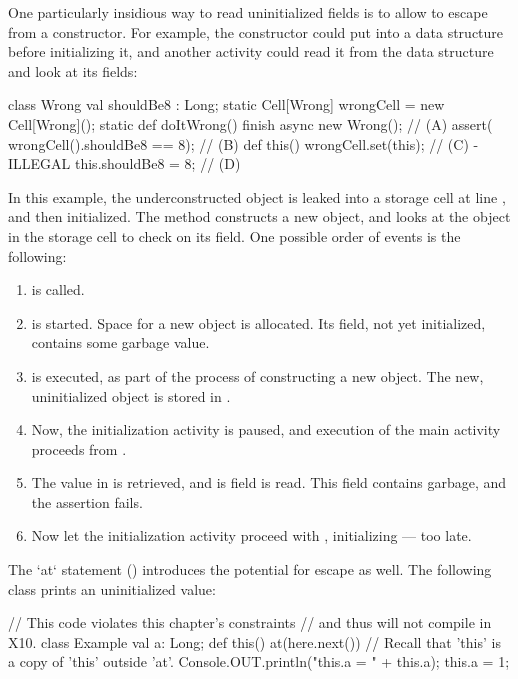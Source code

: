 One particularly insidious way to read uninitialized fields is to allow
 to escape from a constructor. For example, the constructor could
put  into a data structure before initializing it, and another
activity could read it from the data structure and look at its fields:
\begin{xten}
class Wrong {
  val shouldBe8 : Long;
  static Cell[Wrong] wrongCell = new Cell[Wrong]();
  static def doItWrong() {
     finish {
       async { new Wrong(); } // (A)
       assert( wrongCell().shouldBe8 == 8); // (B)
     }
  }
  def this() {
     wrongCell.set(this); // (C) - ILLEGAL
     this.shouldBe8 = 8; // (D)
  }
}
\end{xten}
\noindent
In this example, the underconstructed  object is leaked into a
storage cell at line , and then initialized.  The 
method constructs a new  object, and looks at the 
object in the storage cell to check on its  field.  One
possible order of events is the following:
\begin{enumerate}
\item {} is called.
\item {} is started.  Space for a new  object is allocated.
      Its  field, not yet initialized, contains some garbage
      value.
\item {} is executed, as part of the process of constructing a new
       object.  The new, uninitialized object is stored in
      .
\item Now, the initialization activity is paused, and execution of the main activity
      proceeds from .
\item The value in  is retrieved, and is  field
      is read.  This field contains garbage, and the assertion fails.
\item Now let the initialization activity proceed with ,
      initializing  --- too late.
\end{enumerate}

The \xcd`at` statement () introduces the potential for
escape as well. The following class prints an uninitialized value: 
\begin{xten}
// This code violates this chapter's constraints
// and thus will not compile in X10.
class Example {
  val a: Long;
  def this() { 
    at(here.next()) {
      // Recall that 'this' is a copy of 'this' outside 'at'.
      Console.OUT.println("this.a = " + this.a);
    }
    this.a = 1;
  }
}
\end{xten}
%


